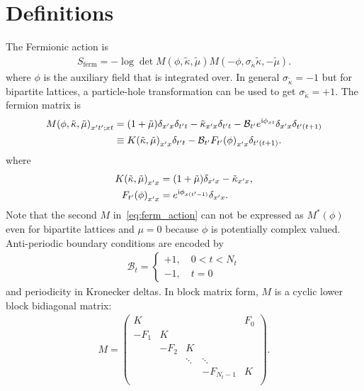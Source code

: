 \documentclass[a4paper, fleqn, twoside, notitlepage]{scrartcl}
\begin{document}
\maketitle
\tableofcontents
\clearpage


\section{Definitions}

The Fermionic action is
\begin{align}
  S_\text{ferm} = - \log \det M(\phi, \tilde{\kappa}, \tilde{\mu}) M(-\phi, \sigma_{\tilde{\kappa}}\tilde{\kappa}, -\tilde{\mu}).\label{eq:ferm_action}
\end{align}
where $\phi$ is the auxiliary field that is integrated over. In general $\sigma_{\tilde{\kappa}} = -1$ but for bipartite lattices, a particle-hole transformation can be used to get $\sigma_{\tilde{\kappa}} = +1$. The fermion matrix is
\begin{align}
  {M(\phi, \tilde{\kappa}, \tilde{\mu})}_{x't';xt}
  &= (1+\tilde{\mu})\delta_{x'x}\delta_{t't} - \tilde{\kappa}_{x'x}\delta_{t't} - \mathcal{B}_{t'} e^{\mathrm{i}\phi_{xt}}\delta_{x'x}\delta_{t'(t+1)}\\
  &\equiv {K(\tilde{\kappa}, \tilde{\mu})}_{x'x}\delta_{t't} - \mathcal{B}_{t'}{F_{t'}(\phi)}_{x'x}\delta_{t'(t+1)}.
\end{align}
where
\begin{align}
  {K(\tilde{\kappa}, \tilde{\mu})}_{x'x} &= (1+\tilde{\mu})\delta_{x'x} - \tilde{\kappa}_{x'x},\\
  {F_{t'}(\phi)}_{x'x} &= e^{\mathrm{i}\phi_{x(t'-1)}}\delta_{x'x}.
\end{align}
Note that the second $M$ in~\eqref{eq:ferm_action} can not be expressed as $M^*(\phi)$ even for bipartite lattices and $\mu=0$ because $\phi$ is potentially complex valued.
Anti-periodic boundary conditions are encoded by
\begin{align}
  \mathcal{B}_t =
  \begin{cases}
    +1,\quad 0 < t < N_t\\
    -1,\quad t = 0
  \end{cases}
\end{align}
and periodicity in Kronecker deltas.
In block matrix form, $M$ is a cyclic lower block bidiagonal matrix:
\begin{align}
  M =
  \begin{pmatrix}
    K    &      &        &        & F_0 \\
    -F_1 & K    &        &        &     \\
         & -F_2 & K      &        &     \\
         &      & \ddots & \ddots &     \\
         &      &        &-F_{N_t-1}&K   \\
  \end{pmatrix}.\label{eq:ferm_mat_block}
\end{align}
\end{document}
